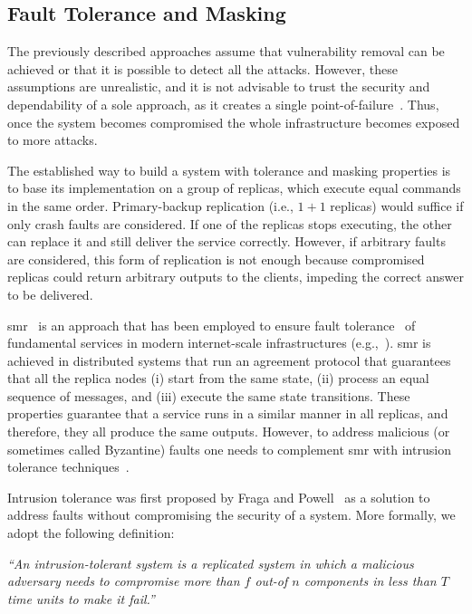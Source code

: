 \subsection{Fault Tolerance and Masking}
The previously described approaches assume that vulnerability removal can be achieved or that it is possible to detect all the attacks.
However, these assumptions are unrealistic, and it is not advisable to trust the security and dependability of a sole approach, as it creates a single point-of-failure~\cite{Verissimo:2003}. 
Thus, once the system becomes compromised the whole infrastructure becomes exposed to more attacks. 

The established way to build a system with tolerance and masking properties is to base its implementation on a group of replicas, which execute equal commands in the same order. 
Primary-backup replication (i.e., $1 + 1$ replicas) would suffice if only crash faults are considered. 
If one of the replicas stops executing, the other can replace it and still deliver the service correctly.
However, if arbitrary faults are considered, this form of replication is not enough because compromised replicas could return arbitrary outputs to the clients, impeding the correct answer to be delivered.

\gls{smr}~\cite{Lamport:1979} is an approach that has been employed to ensure fault tolerance~\cite{Schneider:1990} of fundamental services in modern internet-scale infrastructures (e.g.,~\cite{Hunt:2010,Calder:2011,Corbett:2013}).
\gls{smr} is achieved in distributed systems that run an agreement protocol that guarantees that all the replica nodes (i) start from the same state, (ii) process an equal sequence of messages, and (iii) execute the same state transitions. 
These properties guarantee that a service runs in a similar manner in all replicas, and therefore, they all produce the same outputs.
However, to address malicious (or sometimes called Byzantine) faults one needs to complement \gls{smr} with intrusion tolerance techniques~\cite{Verissimo:2003}.

Intrusion tolerance was first proposed by Fraga and Powell~\cite{Fraga:1985} as a solution to address faults without compromising the security of a system. 
More formally, we adopt the following definition: 

\begin{defn}
\emph{``An intrusion-tolerant system is a replicated system in which a malicious adversary needs to compromise more than $f$ out-of $n$ components in less than $T$ time units to make it fail.''}~\cite{Bessani:2011}
\label{def:def2}
\end{defn}

